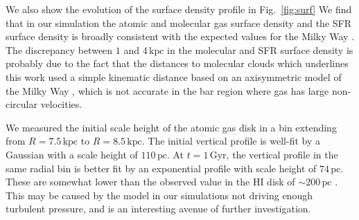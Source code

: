 \begin{appendices}
We also show the evolution of the surface density profile in Fig.~\ref{fig:surf}
We find that in our simulation the atomic and molecular gas surface density and
the SFR surface density is broadly consistent with the expected values for the
Milky Way \citep{2008A&A...487..951K,2022ApJ...929L..18E}. The discrepancy between
$1$ and $4\,\textrm{kpc}$ in the molecular and SFR surface density is probably due
to the fact that the distances to molecular clouds which underlines this work
used a simple kinematic distance based on an axisymmetric model of the Milky
Way \citep{2017ApJ...834...57M}, which is not accurate in the bar region where gas
has large non-circular velocities.

We measured the initial scale height of the atomic gas disk in a bin
extending from $R=7.5\,\textrm{kpc}$ to $R=8.5\,\textrm{kpc}$. The initial
vertical profile is well-fit by a Gaussian with a scale height of
$110\,\textrm{pc}$. At $t=1\,\textrm{Gyr}$, the vertical profile in the same
radial bin is better fit by an exponential profile with scale height of
$74\,\textrm{pc}$. These are somewhat lower than the observed value in the HI
disk of $\sim200\,\textrm{pc}$ \citep{1995ApJ...448..138M, 2017A&A...607A.106M}.
This may be caused by the model in our simulations not driving enough turbulent
pressure, and is an interesting avenue of further investigation.


\end{appendices}
